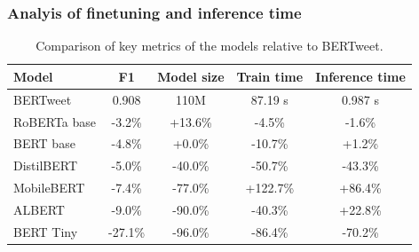 \subsubsection{Analyis of finetuning and inference time}

\begin{table}
    \small
    \centering
    \begin{tabularx}{\textwidth}{|X|c|c|c|c|}
        \hline
        \rowcolor[gray]{0.7}
        \textbf{Model} & \textbf{F1} & \textbf{Model size} & \textbf{Train time} & \textbf{Inference time} \\
        \hline
        \rowcolor[gray]{0.9}
        BERTweet       & 0.908       & 110M                & 87.19 s             & 0.987 s                 \\
        \hline
        RoBERTa base   & -3.2\%      & +13.6\%             & -4.5\%              & -1.6\%                  \\
        BERT base      & -4.8\%      & +0.0\%              & -10.7\%             & +1.2\%                  \\
        DistilBERT     & -5.0\%      & -40.0\%             & -50.7\%             & -43.3\%                 \\
        MobileBERT     & -7.4\%      & -77.0\%             & +122.7\%            & +86.4\%                 \\
        ALBERT         & -9.0\%      & -90.0\%             & -40.3\%             & +22.8\%                 \\
        BERT Tiny      & -27.1\%     & -96.0\%             & -86.4\%             & -70.2\%                 \\
        \hline
    \end{tabularx}
    \caption{Comparison of key metrics of the models relative to BERTweet.}
    \label{tab: relative_comparison_metrics}
\end{table}

